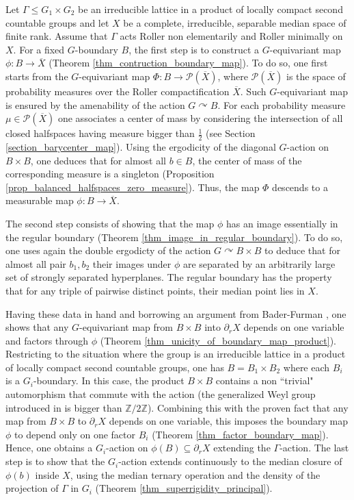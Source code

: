 \documentclass{amsart}
\numberwithin{equation}{section}
\newcommand{\PP}{\mathcal{P}}     %
\newcommand{\ZZ}{\mathbb{Z}}      %
\theoremstyle{definition}
\def\bar{\overline}
\begin{document}
Let $\Gamma\leq G_1\times G_2$ be an irreducible lattice in a product of locally compact second countable groups and let $X$ be a complete, irreducible, separable median space of finite rank. Assume that $\Gamma$ acts Roller non elementarily and Roller minimally on $X$. For a fixed $G$-boundary $B$, the first step is to construct a $G$-equivariant map $\phi:B\rightarrow \bar X$ (Theorem \ref{thm_contruction_boundary_map}). To do so, one first starts from the $G$-equivariant map $\Phi:B\rightarrow \PP(\bar X)$, where $\PP(\bar X)$ is the space of probability measures over the Roller compactification $\bar X$. Such $G$-equivariant map is ensured by the amenability of the action $G\curvearrowright B$. For each probability measure $\mu\in \PP(\bar X)$ one associates a center of mass by considering the intersection of all closed halfspaces having measure bigger than $\frac{1}{2}$ (see Section \ref{section_barycenter_map}). Using the ergodicity of the diagonal $G$-action on $B\times B$, one deduces that for almost all $b\in B$, the center of mass of the corresponding measure is a singleton (Proposition \ref{prop_balanced_halfspaces_zero_measure}). Thus, the map $\Phi$ descends to a measurable map $\phi: B\rightarrow \bar X$.\par 
The second step consists of showing that the map $\phi$ has an image essentially in the regular boundary (Theorem \ref{thm_image_in_regular_boundary}). To do so, one uses again the double ergodicty of the action $G\curvearrowright B\times B$ to deduce that for almost all pair $b_1,b_2$ their images under $\phi$ are separated by an arbitrarily large set of strongly separated hyperplanes. The regular boundary has the property that for any triple of pairwise distinct points, their median point lies in $X$.\par 
 Having these data in hand and borrowing an argument from Bader-Furman \cite{BaderFurman}, one shows that any $G$-equivariant map from $B\times B$ into $\partial_r X$ depends on one variable and factors through $\phi$ (Theorem \ref{thm_unicity_of_boundary_map_product}). Restricting to the situation where the group is an irreducible lattice in a product of locally compact second countable groups, one has $B=B_1\times B_2$ where each $B_i$ is a $G_i$-boundary. In this case, the product $B\times B$ contains a non ``trivial" automorphism that commute with the action (the generalized Weyl group introduced in \cite{Bader-Furman-Weyl_group} is bigger than $\ZZ/2\ZZ$). Combining this with the proven fact that any map from $B\times B$ to $\partial_r X$ depends on one variable, this imposes the boundary map $\phi$ to depend only on one factor $B_i$ (Theorem \ref{thm_factor_boundary_map}). Hence, one obtains a $G_i$-action on $\phi(B)\subseteq \partial_r X$ extending the $\Gamma$-action. The last step is to show that the $G_i$-action extends continuously to the median closure of $\phi(b)$ inside $X$, using the median ternary operation and the density of the projection of $\Gamma$ in $G_i$ (Theorem \ref{thm_superrigidity_principal}).
\end{document}
